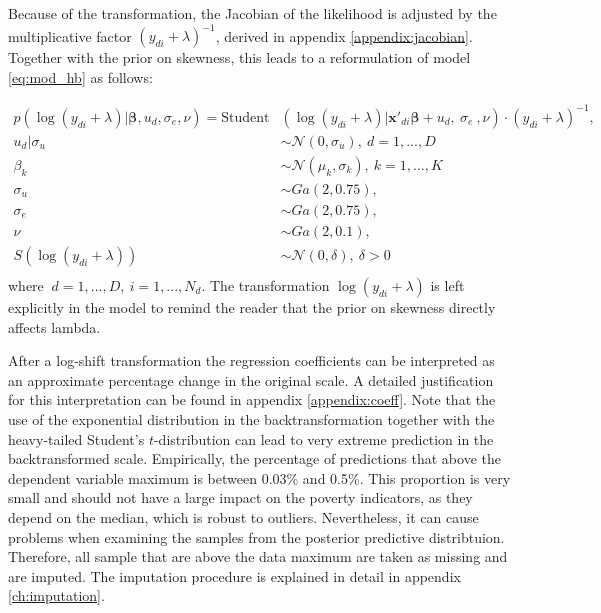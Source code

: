 Because of the transformation, the Jacobian of the likelihood is adjusted by the multiplicative factor $(y_{di} + \lambda)^{-1}$, derived in appendix \ref{appendix:jacobian}. Together with the prior on skewness, this leads to a reformulation of model \ref{eq:mod_hb} as follows:

\begin{equation}
    \begin{split}
        p(\log(y_{di} + \lambda) |\boldsymbol \beta, u_d, \sigma_e, \nu)   =        \text{Student}&(\log(y_{di} + \lambda)| \boldsymbol{x'}_{di} \boldsymbol \beta + u_d,\ \sigma_e\ , \nu)\cdot (y_{di} + \lambda)^{-1}, \\
        u_d | \sigma_u & \sim \mathcal N(0, \sigma_u),\ d = 1, ..., D \\
        \beta_k & \sim \mathcal N(\mu_k, \sigma_k),\ k = 1, ..., K\\
        \sigma_u & \sim Ga(2, 0.75), \\
        \sigma_e & \sim Ga(2, 0.75), \\
        \nu & \sim Ga(2, 0.1), \\
        S(\log(y_{di} + \lambda)) & \sim \mathcal N(0, \delta), ~ \delta > 0\\
    \end{split}
    \label{eq:trafo_hb}
\end{equation}
where $\ d = 1, ..., D,\ i = 1, ..., N_d$. The transformation $\log(y_{di} + \lambda)$ is left explicitly in the model to remind the reader that the prior on skewness directly affects lambda.

After a log-shift transformation the regression coefficients can be interpreted as an approximate percentage change in the original scale.
A detailed justification for this interpretation can be found in appendix \ref{appendix:coeff}.
Note that the use of the exponential distribution in the backtransformation together with the heavy-tailed Student's $t$-distribution can lead to very extreme prediction in the backtransformed scale.
Empirically, the percentage of predictions that above the dependent variable maximum is between 0.03\% and 0.5\%.
This proportion is very small and should not have a large impact on the poverty indicators, as they depend on the median, which is robust to outliers.
Nevertheless, it can cause problems when examining the samples from the posterior predictive distribtuion.
Therefore, all sample that are above the data maximum are taken as missing and are imputed.
The imputation procedure is explained in detail in appendix \ref{ch:imputation}.



